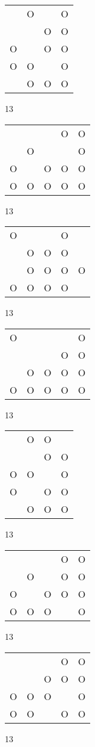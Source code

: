 \begin{tabular}{|m{0.2cm}m{0.2cm}m{0.2cm}m{0.2cm}|}\hline
 &O& &O\\
 & &O&O\\
O& &O&O\\
O&O& &O\\
 &O&O&O\\
\hline\end{tabular}13
\begin{tabular}{|m{0.2cm}m{0.2cm}m{0.2cm}m{0.2cm}m{0.2cm}|}\hline
 & & &O&O\\
 &O& & &O\\
O& &O&O&O\\
O&O&O&O&O\\
\hline\end{tabular}13
\begin{tabular}{|m{0.2cm}m{0.2cm}m{0.2cm}m{0.2cm}m{0.2cm}|}\hline
O& & &O& \\
 &O&O&O& \\
 &O&O&O&O\\
O&O&O&O& \\
\hline\end{tabular}13
\begin{tabular}{|m{0.2cm}m{0.2cm}m{0.2cm}m{0.2cm}m{0.2cm}|}\hline
O& & & &O\\
 & & &O&O\\
 &O&O&O&O\\
O&O&O&O&O\\
\hline\end{tabular}13
\begin{tabular}{|m{0.2cm}m{0.2cm}m{0.2cm}m{0.2cm}|}\hline
 &O&O& \\
 & &O&O\\
O&O& &O\\
O& &O&O\\
 &O&O&O\\
\hline\end{tabular}13
\begin{tabular}{|m{0.2cm}m{0.2cm}m{0.2cm}m{0.2cm}m{0.2cm}|}\hline
 & & &O&O\\
 &O& &O&O\\
O& &O&O&O\\
O&O&O& &O\\
\hline\end{tabular}13
\begin{tabular}{|m{0.2cm}m{0.2cm}m{0.2cm}m{0.2cm}m{0.2cm}|}\hline
 & & &O&O\\
 & &O&O&O\\
O&O&O& &O\\
O&O& &O&O\\
\hline\end{tabular}13
